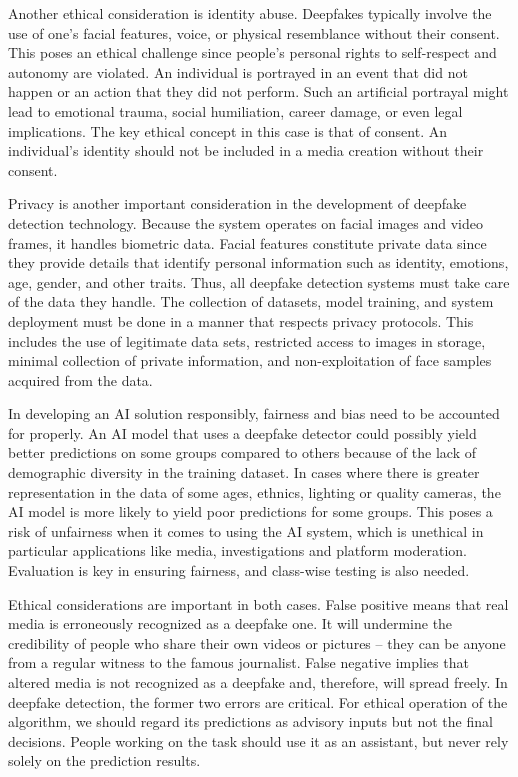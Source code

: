 \documentclass[12pt,a4paper]{report}
\begin{document}
Another ethical consideration is identity abuse. Deepfakes typically involve the use of one’s facial features, voice, or physical resemblance without their consent. This poses an ethical challenge since people’s personal rights to self-respect and autonomy are violated. An individual is portrayed in an event that did not happen or an action that they did not perform. Such an artificial portrayal might lead to emotional trauma, social humiliation, career damage, or even legal implications. The key ethical concept in this case is that of consent. An individual’s identity should not be included in a media creation without their consent.

Privacy is another important consideration in the development of deepfake detection technology. Because the system operates on facial images and video frames, it handles biometric data. Facial features constitute private data since they provide details that identify personal information such as identity, emotions, age, gender, and other traits. Thus, all deepfake detection systems must take care of the data they handle. The collection of datasets, model training, and system deployment must be done in a manner that respects privacy protocols. This includes the use of legitimate data sets, restricted access to images in storage, minimal collection of private information, and non-exploitation of face samples acquired from the data.

In developing an AI solution responsibly, fairness and bias need to be accounted for properly. An AI model that uses a deepfake detector could possibly yield better predictions on some groups compared to others because of the lack of demographic diversity in the training dataset. In cases where there is greater representation in the data of some ages, ethnics, lighting or quality cameras, the AI model is more likely to yield poor predictions for some groups. This poses a risk of unfairness when it comes to using the AI system, which is unethical in particular applications like media, investigations and platform moderation. Evaluation is key in ensuring fairness, and class-wise testing is also needed.

Ethical considerations are important in both cases. False positive means that real media is erroneously recognized as a deepfake one. It will undermine the credibility of people who share their own videos or pictures – they can be anyone from a regular witness to the famous journalist. False negative implies that altered media is not recognized as a deepfake and, therefore, will spread freely. In deepfake detection, the former two errors are critical. For ethical operation of the algorithm, we should regard its predictions as advisory inputs but not the final decisions. People working on the task should use it as an assistant, but never rely solely on the prediction results.
\end{document}
